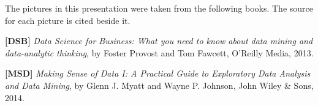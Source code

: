 The pictures in this presentation were taken from the following books. The source for each picture is cited beside it. 

\textbf{[DSB]} \emph{Data Science for Business: What you need to know about data mining and data-analytic thinking}, by Foster Provost and Tom Fawcett, O'Reilly Media, 2013. 

\textbf{[MSD]} \emph{Making Sense of Data I: A Practical Guide to Exploratory Data Analysis and Data Mining}, by Glenn J. Myatt and Wayne P. Johnson, John Wiley \& Sons, 2014. 








